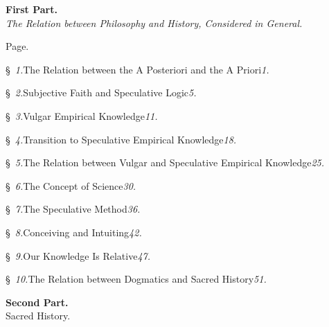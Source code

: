 \documentclass[12pt]{book}
\begin{document}
\begingroup
\parindent=0pt
\parfillskip=0pt

\begin{center}
  {\large\bfseries First Part.}\\[0.5\baselineskip]
  \emph{The Relation between Philosophy and History, Considered in
  General.}
\end{center}
\medskip

{\raggedleft Page.\par}
\smallskip

§~\textit{1.}\quad The Relation between the A Posteriori and the A Priori\dotfill\textit{1.}\par
§~\textit{2.}\quad Subjective Faith and Speculative Logic\dotfill\textit{5.}\par
§~\textit{3.}\quad Vulgar Empirical Knowledge\dotfill\textit{11.}\par
§~\textit{4.}\quad Transition to Speculative Empirical Knowledge\dotfill\textit{18.}\par
§~\textit{5.}\quad The Relation between Vulgar and Speculative Empirical Knowledge\dotfill\textit{25.}\par
§~\textit{6.}\quad The Concept of Science\dotfill\textit{30.}\par
§~\textit{7.}\quad The Speculative Method\dotfill\textit{36.}\par
§~\textit{8.}\quad Conceiving and Intuiting\dotfill\textit{42.}\par
§~\textit{9.}\quad Our Knowledge Is Relative\dotfill\textit{47.}\par
§~\textit{10.}\quad The Relation between Dogmatics and Sacred History\dotfill\textit{51.}\par

\bigskip
\begin{center}
  {\large\bfseries Second Part.}\\[0.5\baselineskip]
  {\large Sacred History.}
\end{center}
\medskip
\end{document}
